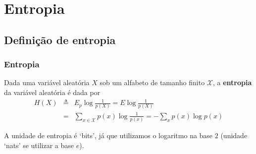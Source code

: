 \section{Entropia}
\subsection{Definição de entropia}
\begin{frame}%
  \frametitle{Entropia}
  \begin{definition}[Entropia]\label{def-entropia}
  Dada uma variável aleatória $X$ sob um alfabeto de tamanho finito $\mathcal{X}$, a \textbf{entropia}
  da variável aleatória é dada por
  \begin{eqnarray}
  H(X) &\triangleq& E_p \log \frac{1}{p(X)} = E \log \frac{1}{p(X)} \\
        &=& \sum_{x \in \mathcal{X}} p(x) \log \frac{1}{p(x)} = - \sum_x p(x) \log p(x)
  \end{eqnarray}
  \end{definition}
  A unidade de entropia é `bits', já que utilizamos o logaritmo na base $2$ (unidade `nats' se 
  utilizar a base $e$).
\end{frame}

